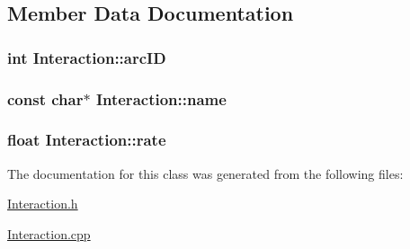 \subsection{Member Data Documentation}
\hypertarget{classInteraction_a3f30aa82589c3b34bb2feb0b09835aad}{
\subsubsection[{arcID}]{\setlength{\rightskip}{0pt plus 5cm}int {\bf Interaction::arcID}}}
\label{classInteraction_a3f30aa82589c3b34bb2feb0b09835aad}
\hypertarget{classInteraction_a32877e378c8312363a02622d09ae67d4}{
\subsubsection[{name}]{\setlength{\rightskip}{0pt plus 5cm}const char$\ast$ {\bf Interaction::name}}}
\label{classInteraction_a32877e378c8312363a02622d09ae67d4}
\hypertarget{classInteraction_a0a5f4ea012be478c8fe13de552ea5055}{
\subsubsection[{rate}]{\setlength{\rightskip}{0pt plus 5cm}float {\bf Interaction::rate}}}
\label{classInteraction_a0a5f4ea012be478c8fe13de552ea5055}


The documentation for this class was generated from the following files:\begin{DoxyCompactItemize}
\item 
\hyperlink{Interaction_8h}{Interaction.h}\item 
\hyperlink{Interaction_8cpp}{Interaction.cpp}\end{DoxyCompactItemize}
